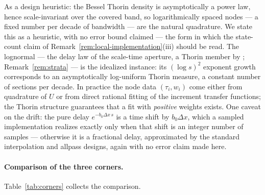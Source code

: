 As a design heuristic: the Bessel Thorin
density is asymptotically a power law, hence scale-invariant over the covered band, so
logarithmically spaced nodes --- a fixed number per decade of bandwidth --- are the natural
quadrature. We state this as a heuristic, with no error bound claimed --- the form in
which the state-count claim of Remark~\ref{rem:local-implementation}(iii) should be read. The lognormal
--- the delay law of the scale-time aperture, a Thorin member by
; Remark~\ref{rem:strata} --- is the idealized instance: its
$(\log s)^2$ exponent growth corresponds to an asymptotically log-uniform Thorin measure,
a constant number of sections per decade. In practice the
node data $(\tau_i, w_i)$ come either from quadrature of $U$ or from direct rational fitting
of the increment transfer functions; the Thorin structure guarantees that a fit with
\emph{positive} weights exists. One caveat on the drift: the pure delay
$e^{-b_0 \Delta x\, s}$ is a time shift by $b_0 \Delta x$, which a sampled implementation
realizes exactly only when that shift is an integer number of samples --- otherwise it is a
fractional delay, approximated by the standard interpolation and allpass designs, again with
no error claim made here.

\paragraph{Comparison of the three corners.}
Table~\ref{tab:corners} collects the comparison.

